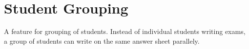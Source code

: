 \section{Student Grouping}
A feature for grouping of students. Instead of individual students writing exams, a group of students can write on the same answer sheet parallely.